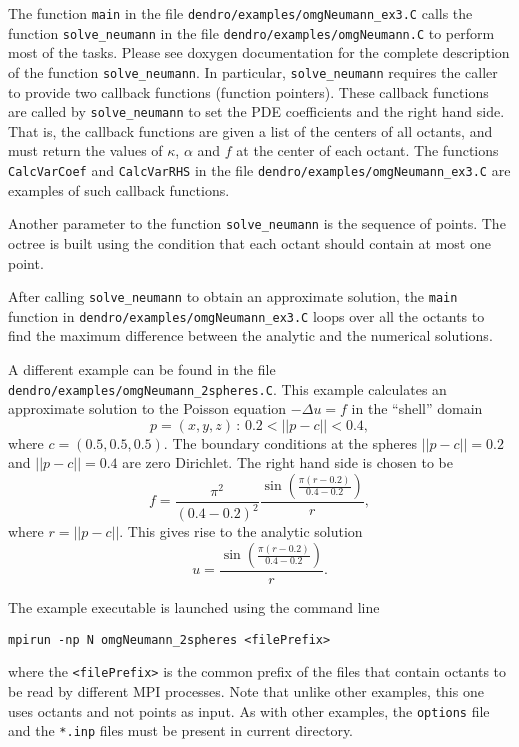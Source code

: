 \documentclass[10pt,reqno,a4paper]{report}
\numberwithin{equation}{section}
\begin{document}
The function \lstinline[basicstyle=\bfseries]!main! in the file \verb'dendro/examples/omgNeumann_ex3.C' calls the function \lstinline[basicstyle=\bfseries]!solve_neumann! in the file  \verb'dendro/examples/omgNeumann.C' to perform most of the tasks. Please see doxygen documentation for the complete description of the function \lstinline[basicstyle=\bfseries]!solve_neumann!. 
In particular, \lstinline[basicstyle=\bfseries]!solve_neumann! requires the caller to provide two callback functions (function pointers). These callback functions are called by \lstinline[basicstyle=\bfseries]'solve_neumann' to set the PDE coefficients and the right hand side. That is, the callback functions are given a list of the centers of all octants, and must return the values of $\kappa$, $\alpha$ and $f$ at the center of each octant. The functions \lstinline[basicstyle=\bfseries]'CalcVarCoef' and \lstinline[basicstyle=\bfseries]'CalcVarRHS' in the file \verb'dendro/examples/omgNeumann_ex3.C' are  examples of such callback functions.

Another parameter to the function \lstinline[basicstyle=\bfseries]'solve_neumann' is the sequence of points. The octree is built using the condition that each octant should contain at most one point.

After calling \lstinline[basicstyle=\bfseries]'solve_neumann' to obtain an approximate solution, the \lstinline[basicstyle=\bfseries]'main' function in \verb'dendro/examples/omgNeumann_ex3.C' loops over all the octants to find the maximum difference between the analytic and the numerical solutions.

A different example can be found in the file  \verb'dendro/examples/omgNeumann_2spheres.C'. This example calculates an approximate solution to the Poisson equation $-\Delta u = f$  in the ``shell'' domain 
\[
p=(x,y,z)\,:\, 0.2<||p-c||<0.4,
\]
where $c=(0.5,0.5,0.5)$. The boundary conditions at the spheres $||p-c||=0.2$ and $||p-c||=0.4$ are zero Dirichlet. The right hand side is chosen to be 
\[
f=\frac{\pi^2}{(0.4-0.2)^2}\frac{\sin(\frac{\pi(r-0.2)}{0.4-0.2})}{r}, 
\]
where $r=||p-c||$. This gives rise to the analytic solution 
\[
u=\frac{\sin(\frac{\pi(r-0.2)}{0.4-0.2})}{r}.
\]

The example executable is launched using the command line
\begin{verbatim}
mpirun -np N omgNeumann_2spheres <filePrefix>
\end{verbatim}
where the \verb|<filePrefix>| is the common prefix of the files that contain octants to be read by different 
MPI processes. Note that unlike other examples, this one uses octants and not points as input. As with other examples, the \verb'options' file and the \verb'*.inp' files must be present in current directory.
\end{document}
